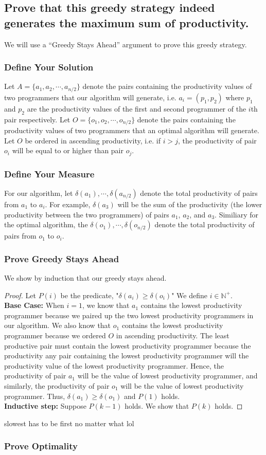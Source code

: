 \documentclass[11pt]{scrartcl}
\begin{document}
\subsection{
	Prove that this greedy strategy indeed generates the maximum sum of
	productivity.
}
We will use a “Greedy Stays Ahead” argument to prove this greedy strategy. 
\subsubsection{
	Define Your Solution
}
Let $A=\{a_1, a_2, \cdots, a_{n/2}\}$ denote the pairs containing the productivity values of two programmers 
that our algorithm will generate, i.e. $a_i = (p_1, p_2)$ where $p_1$ and $p_2$ are the productivity values of the 
first and second programmer of the $i$th pair respectively.   
Let $O = \{o_1, o_2, \cdots, o_{n/2}\}$ denote the pairs containing the productivity values of two programmers 
that an optimal algorithm will generate. Let $O$ be ordered in ascending productivity, i.e. if $i>j$,
the productivity of pair $o_i$ will be equal to or higher than pair $o_j$.
\subsubsection{
	Define Your Measure
}
For our algorithm, let $\delta(a_1), \cdots, \delta(a_{n/2})$ denote the total productivity of pairs 
from $a_1$ to $a_i$. For example, $\delta(a_3)$ will be the sum of the productivity (the 
lower productivity between the two programmers) of pairs $a_1$, $a_2$, and $a_3$.
Similiary for the optimal algorithm, the $\delta(o_1), \cdots, \delta(o_{n/2})$ denote 
the total productivity of pairs from $o_1$ to $o_i$.
\subsubsection{
	Prove Greedy Stays Ahead
}
We show by induction that our greedy stays ahead.
\begin{proof}
	Let $P(i)$ be the predicate, "$\delta(a_i) \geq \delta(o_i)$"
	We define $i \in \mathbb{N}^+$. \\
	\textbf{Base Case:} When $i = 1$, we know that $a_1$ contains the lowest productivity programmer
	because we paired up the two lowest productivity programmers in our algorithm. We also know that 
	$o_1$ contains the lowest productivity programmer because we ordered $O$ in ascending productivity.
	The least productive pair must contain the lowest productivity programmer because the 
	productivity any pair containing the lowest productivity programmer will the productivity value of the 
	lowest productivity programmer.
	Hence, the productivity of pair $a_1$ will be the value of lowest productivity programmer, and 
	similarly, the productivity of pair $o_1$ will be the value of lowest productivity programmer.
	Thus, $\delta(a_1) \geq \delta(o_1)$ and $P(1)$ holds.\\
	\textbf{Inductive step:} Suppose $P(k-1)$ holds. We show that $P(k)$ holds.

\end{proof} 


slowest has to be first no matter what lol 
\subsubsection{
	Prove Optimality
}
\end{document}
